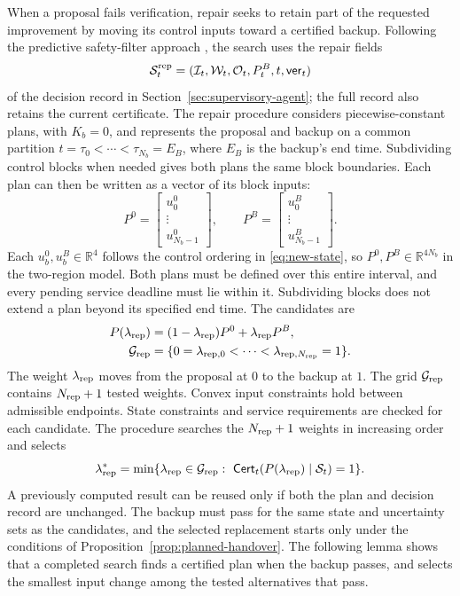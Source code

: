 \documentclass[final]{cas-sc}
\theoremstyle{definition}
\theoremstyle{plain}
\theoremstyle{definition}
\theoremstyle{plain}
\newcommand{\R}{\mathbb{R}}
\begin{document}
When a proposal fails verification, repair seeks to retain part of the
requested improvement by moving its control inputs toward a certified
backup. Following the predictive safety-filter approach
\cite{wabersich2021}, the search uses the repair fields
\[
\mathcal S_t^{\rm rep}=(\mathcal I_t,\mathcal W_t,\mathcal O_t,
P_t^{B},t,\mathsf{ver}_t)
\]
of the decision record in Section~\ref{sec:supervisory-agent}; the full record
also retains the current certificate. The repair procedure considers
piecewise-constant plans, with $K_b=0$, and represents the proposal and
backup on a common partition $t=\tau_0<\cdots<\tau_{N_b}=E_B$, where
$E_B$ is the backup's end time. Subdividing control blocks when needed
gives both plans the same block boundaries. Each plan can then be
written as a vector of its block inputs:
\[
P^{0}=\begin{bmatrix}u_0^{0}\\ \vdots\\ u_{N_b-1}^{0}\end{bmatrix},
\qquad
P^{B}=\begin{bmatrix}u_0^{B}\\ \vdots\\ u_{N_b-1}^{B}\end{bmatrix}.
\]
Each $u_b^{0},u_b^{B}\in\R^{4}$ follows the control ordering in
\eqref{eq:new-state}, so $P^{0},P^{B}\in\R^{4N_b}$ in the
two-region model. Both plans must be defined over this entire interval,
and every pending service deadline must lie within it. Subdividing
blocks does not extend a plan beyond its specified end time. The
candidates are
\begin{equation}
\begin{aligned}
P(\lambda_{\rm rep})&=(1-\lambda_{\rm rep})P^{0}+\lambda_{\rm rep}P^{B},\\
\mathcal G_{\rm rep}&=\{0=\lambda_{{\rm rep},0}<\cdots
<\lambda_{{\rm rep},N_{\rm rep}}=1\}.
\end{aligned}
\label{eq:repair-family}
\end{equation}
The weight $\lambda_{\rm rep}$ moves from the proposal at $0$ to the
backup at $1$. The grid $\mathcal G_{\rm rep}$ contains
$N_{\rm rep}+1$ tested weights. Convex input constraints hold between
admissible endpoints. State constraints and service requirements are
checked for each candidate. The procedure searches the
$N_{\rm rep}+1$ weights in increasing order and selects
\begin{equation}
\lambda_{\rm rep}^{*}=\min\{\lambda_{\rm rep}\in\mathcal G_{\rm rep}:\
\mathsf{Cert}_t(P(\lambda_{\rm rep})\mid\mathcal S_t)=1\}.
\label{eq:repair-selection}
\end{equation}
A previously computed result can be reused only if both the plan and
decision record are unchanged. The backup must pass for the same state
and uncertainty sets as the candidates, and the selected replacement
starts only under the conditions of Proposition~\ref{prop:planned-handover}. The
following lemma shows that a completed search finds a certified plan
when the backup passes, and selects the smallest input change among
the tested alternatives that pass.
\end{document}
